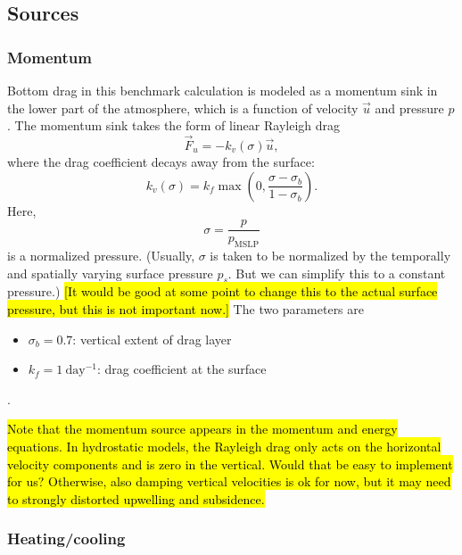 \documentclass{report}
\begin{document}
\subsection{Sources}

\subsubsection{Momentum} 

Bottom drag in this benchmark calculation is modeled as a momentum sink in the lower part of the atmosphere, which is a function of velocity $\vec{u}$ and pressure $p$. The momentum sink takes the form of linear Rayleigh drag
\begin{equation}
    \vec{F}_u = -k_v(\sigma) \vec{u},
\end{equation}
where the drag coefficient decays away from the surface:
\begin{equation}
    k_v(\sigma) = k_f \max \left( 0, \frac{\sigma - \sigma_b}{1-\sigma_b} \right).
\end{equation}
Here,
\[
\sigma = \frac{p}{p_{\mathrm{MSLP}}}
\]
is a normalized pressure. (Usually, $\sigma$ is taken to be normalized by the temporally and spatially varying surface pressure $p_s$. But we can simplify this to a constant pressure.) \hl{[It would be good at some point to change this to the actual surface pressure, but this is not important now.]} The two parameters are
\begin{itemize}
    \item $\sigma_b = 0.7$: vertical extent of drag layer
    \item $k_f = 1~\mathrm{day^{-1}}$: drag coefficient at the surface
\end{itemize}.

\hl{Note that the momentum source appears in the momentum and energy equations. In hydrostatic models, the Rayleigh drag only acts on the horizontal velocity components and is zero in the vertical. Would that be easy to implement for us? Otherwise, also damping vertical velocities is ok for now, but it may need to strongly distorted upwelling and subsidence.}

\subsubsection{Heating/cooling}
\end{document}
